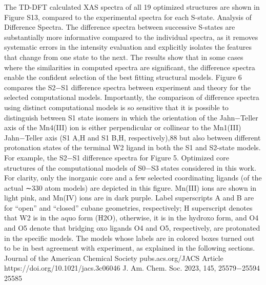 \documentclass{article}
\begin{document}
The TD-DFT calculated XAS spectra of all 19 optimized
structures are shown in Figure S13, compared to the
experimental spectra for each S-state.
Analysis of Difference Spectra. The difference spectra
between successive S-states are substantially more informative
compared to the individual spectra, as it removes systematic
errors in the intensity evaluation and explicitly isolates the
features that change from one state to the next. The results
show that in some cases where the similarities in computed
spectra are significant, the difference spectra enable the
confident selection of the best fitting structural models.
Figure 6 compares the S2−S1 difference spectra between
experiment and theory for the selected computational models.
Importantly, the comparison of difference spectra using
distinct computational models is so sensitive that it is possible
to distinguish between S1 state isomers in which the
orientation of the Jahn−Teller axis of the Mn4(III) ion is
either perpendicular or collinear to the Mn1(III) Jahn−Teller
axis (S1
A,H and S1
B,H, respectively),88 but also between different
protonation states of the terminal W2 ligand in both the S1 and
S2-state models. For example, the S2−S1 difference spectra for
Figure 5. Optimized core structures of the computational models of S0−S3 states considered in this work. For clarity, only the inorganic core and a
few selected coordinating ligands (of the actual ∼330 atom models) are depicted in this figure. Mn(III) ions are shown in light pink, and Mn(IV)
ions are in dark purple. Label superscripts A and B are for “open” and “closed” cubane geometries, respectively; H superscript denotes that W2 is in
the aquo form (H2O), otherwise, it is in the hydroxo form, and O4 and O5 denote that bridging oxo ligands O4 and O5, respectively, are
protonated in the specific models. The models whose labels are in colored boxes turned out to be in best agreement with experiment, as explained
in the following sections.
Journal of the American Chemical Society
pubs.acs.org/JACS
Article
https://doi.org/10.1021/jacs.3c06046
J. Am. Chem. Soc. 2023, 145, 25579−25594
25585

\newpage

\end{document}
